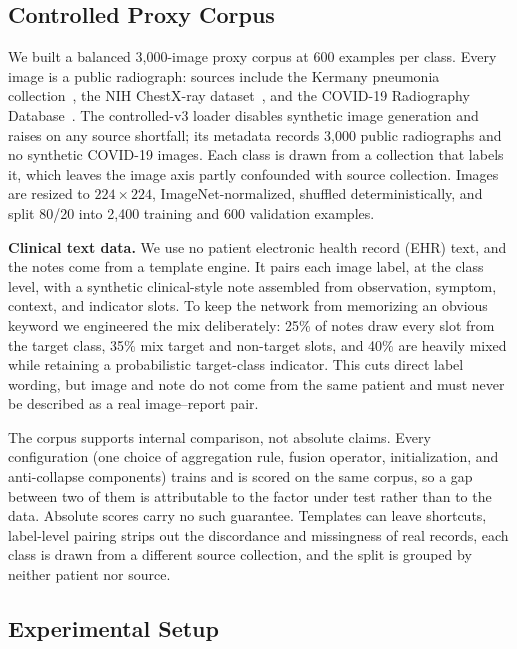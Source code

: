 \documentclass[letterpaper, conference]{IEEEtran}
\begin{document}
\subsection{Controlled Proxy Corpus}

We built a balanced 3,000-image proxy corpus at 600 examples per class. Every
image is a public radiograph: sources include the Kermany pneumonia
collection~\cite{Kermany2018}, the NIH ChestX-ray dataset~\cite{Wang2017chestxray8},
and the COVID-19 Radiography Database~\cite{Chowdhury2020covid}. The controlled-v3
loader disables synthetic image generation and raises on any source shortfall;
its metadata records 3,000 public radiographs and no synthetic COVID-19 images.
Each class is drawn from a collection that labels it, which leaves the image axis
partly confounded with source collection. Images are resized to
$224{\times}224$, ImageNet-normalized, shuffled deterministically, and split 80/20
into 2,400 training and 600 validation examples.

\textbf{Clinical text data.}
We use no patient electronic health record (EHR) text, and the notes come from a
template engine. It pairs each image label, at
the class level, with a synthetic clinical-style note assembled from observation,
symptom, context, and indicator slots. To keep the network from memorizing an
obvious keyword we engineered the mix deliberately: 25\% of notes
draw every slot from the target class, 35\% mix target and non-target slots, and
40\% are heavily mixed while retaining a probabilistic target-class indicator.
This cuts direct label wording, but image and note do not come from the same
patient and must never be described as a real image--report pair.

\label{sec:corpus}
The corpus supports internal comparison, not absolute claims.
Every configuration (one choice of aggregation rule, fusion operator,
initialization, and anti-collapse components) trains and is scored on the same
corpus, so a gap between two of them is
attributable to the factor under test rather than to the data. Absolute scores carry
no such guarantee. Templates can leave
shortcuts, label-level pairing strips out the discordance and missingness of real
records, each class is drawn from a different source collection, and the split
is grouped by neither patient nor source.

\subsection{Experimental Setup}
\end{document}
